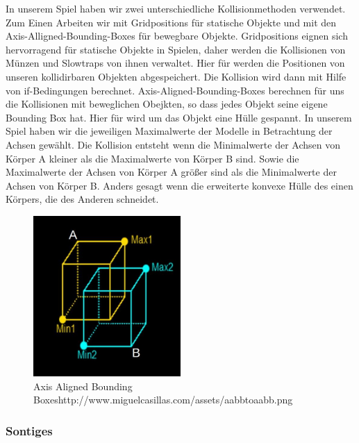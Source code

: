 \documentclass[12pt]{article}
\begin{document}
In unserem Spiel haben wir zwei unterschiedliche Kollisionmethoden verwendet.
Zum Einen Arbeiten wir mit Gridpositions für statische Objekte und mit den
Axis-Alligned-Bounding-Boxes für bewegbare Objekte.\newline
\newline
Gridpositions eignen sich hervorragend für statische Objekte in Spielen, daher werden die Kollisionen
von Münzen und Slowtraps von ihnen verwaltet. Hier für werden die Positionen von unseren kollidirbaren
Objekten abgespeichert. Die Kollision wird dann mit Hilfe von if-Bedingungen berechnet.\newline
\newline
Axis-Aligned-Bounding-Boxes berechnen für uns die Kollisionen mit beweglichen Obejkten, so dass jedes Objekt seine eigene
Bounding Box hat. Hier für wird um das Objekt eine Hülle gespannt. In unserem Spiel haben wir die jeweiligen Maximalwerte
der Modelle in Betrachtung der Achsen gewählt. Die Kollision entsteht wenn die Minimalwerte der Achsen von Körper A kleiner
als die Maximalwerte von Körper B sind. Sowie die Maximalwerte der Achsen von Körper A größer sind als die Minimalwerte der
Achsen von Körper B. Anders gesagt wenn die erweiterte konvexe Hülle des einen Körpers, die des Anderen schneidet.

\begin{figure}
	\centering
	\includegraphics[width=0.5\textwidth]{AABB}
	\caption{Axis Aligned Bounding Boxes\newline \tiny http://www.miguelcasillas.com/assets/aabbtoaabb.png
		\label{fig:AABB}}
\end{figure}


\vspace{1cm}
\subsubsection{Sontiges}
\end{document}
